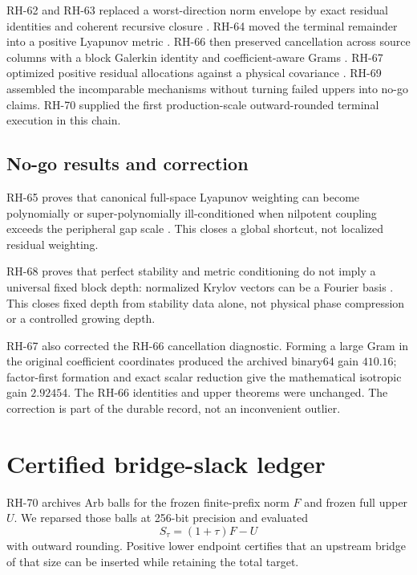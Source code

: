\documentclass[11pt]{article}
\theoremstyle{definition}
\begin{document}
RH-62 and RH-63 replaced a worst-direction norm envelope by exact residual
identities and coherent recursive closure
\citep{WangKrylov2026,WangNested2026}.  RH-64 moved the terminal remainder
into a positive Lyapunov metric \citep{WangWeighted2026}.  RH-66 then
preserved cancellation across source columns with a block Galerkin identity
and coefficient-aware Grams \citep{WangBlockGram2026}.  RH-67 optimized
positive residual allocations against a physical covariance
\citep{WangCovariance2026}.  RH-69 assembled the incomparable mechanisms
without turning failed uppers into no-go claims.  RH-70 supplied the first
production-scale outward-rounded terminal execution in this chain.

\subsection{No-go results and correction}

RH-65 proves that canonical full-space Lyapunov weighting can become
polynomially or super-polynomially ill-conditioned when nilpotent coupling
exceeds the peripheral gap scale \citep{WangConditioning2026}.  This closes a
global shortcut, not localized residual weighting.

RH-68 proves that perfect stability and metric conditioning do not imply a
universal fixed block depth: normalized Krylov vectors can be a Fourier basis
\citep{WangDepth2026}.  This closes fixed depth from stability data alone, not
physical phase compression or a controlled growing depth.

RH-67 also corrected the RH-66 cancellation diagnostic.  Forming a large Gram
in the original coefficient coordinates produced the archived binary64 gain
$410.16$; factor-first formation and exact scalar reduction give the
mathematical isotropic gain $2.92454$.  The RH-66 identities and upper
theorems were unchanged.  The correction is part of the durable record, not
an inconvenient outlier.

\section{Certified bridge-slack ledger}
\label{sec:slack}

RH-70 archives Arb balls for the frozen finite-prefix norm $F$ and frozen
full upper $U$.  We reparsed those balls at 256-bit precision
\citep{Johansson2017} and evaluated
\[
 S_\tau=(1+\tau)F-U
\]
with outward rounding.  Positive lower endpoint certifies that an upstream
bridge of that size can be inserted while retaining the total target.
\end{document}
